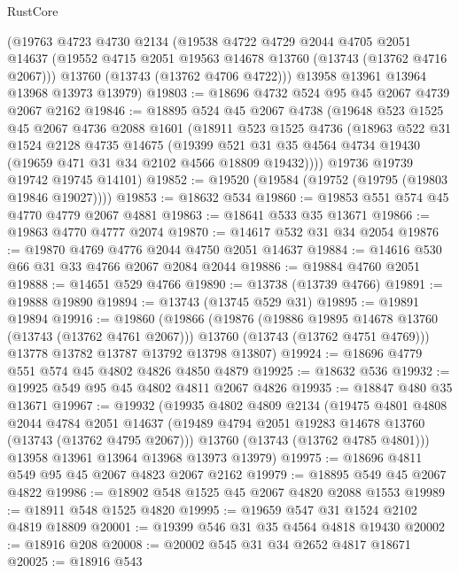 \begin{lexlean}{RustCore}
\begin{coremodule}
    (@19763
      @4723
      @4730
      @2134
      (@19538
        @4722
        @4729
        @2044
        @4705
        @2051
        @14637
        (@19552 @4715 @2051 @19563 @14678 @13760 (@13743 (@13762 @4716 @2067)))
        @13760
        (@13743 (@13762 @4706 @4722)))
      @13958
      @13961
      @13964
      @13968
      @13973
      @13979)
@19803 := @18696 @4732 @524 @95 @45 @2067 @4739 @2067 @2162
@19846 := @18895
    @524
    @45
    @2067
    @4738
    (@19648
      @523
      @1525
      @45
      @2067
      @4736
      @2088
      @1601
      (@18911
        @523
        @1525
        @4736
        (@18963
          @522
          @31
          @1524
          @2128
          @4735
          @14675
          (@19399 @521 @31 @35 @4564 @4734 @19430 (@19659 @471 @31 @34 @2102 @4566 @18809 @19432))))
      @19736
      @19739
      @19742
      @19745
      @14101)
@19852 := @19520 (@19584 (@19752 (@19795 (@19803 @19846 @19027))))
@19853 := @18632 @534
@19860 := @19853 @551 @574 @45 @4770 @4779 @2067 @4881
@19863 := @18641 @533 @35 @13671
@19866 := @19863 @4770 @4777 @2074
@19870 := @14617 @532 @31 @34 @2054
@19876 := @19870 @4769 @4776 @2044 @4750 @2051 @14637
@19884 := @14616 @530 @66 @31 @33 @4766 @2067 @2084 @2044
@19886 := @19884 @4760 @2051
@19888 := @14651 @529 @4766
@19890 := @13738 (@13739 @4766)
@19891 := @19888 @19890
@19894 := @13743 (@13745 @529 @31)
@19895 := @19891 @19894
@19916 := @19860
    (@19866
      (@19876
        (@19886 @19895 @14678 @13760 (@13743 (@13762 @4761 @2067)))
        @13760
        (@13743 (@13762 @4751 @4769)))
      @13778
      @13782
      @13787
      @13792
      @13798
      @13807)
@19924 := @18696 @4779 @551 @574 @45 @4802 @4826 @4850 @4879
@19925 := @18632 @536
@19932 := @19925 @549 @95 @45 @4802 @4811 @2067 @4826
@19935 := @18847 @480 @35 @13671
@19967 := @19932
    (@19935
      @4802
      @4809
      @2134
      (@19475
        @4801
        @4808
        @2044
        @4784
        @2051
        @14637
        (@19489 @4794 @2051 @19283 @14678 @13760 (@13743 (@13762 @4795 @2067)))
        @13760
        (@13743 (@13762 @4785 @4801)))
      @13958
      @13961
      @13964
      @13968
      @13973
      @13979)
@19975 := @18696 @4811 @549 @95 @45 @2067 @4823 @2067 @2162
@19979 := @18895 @549 @45 @2067 @4822
@19986 := @18902 @548 @1525 @45 @2067 @4820 @2088 @1553
@19989 := @18911 @548 @1525 @4820
@19995 := @19659 @547 @31 @1524 @2102 @4819 @18809
@20001 := @19399 @546 @31 @35 @4564 @4818 @19430
@20002 := @18916 @208
@20008 := @20002 @545 @31 @34 @2652 @4817 @18671
@20025 := @18916
    @543

\end{coremodule}
\end{lexlean}
